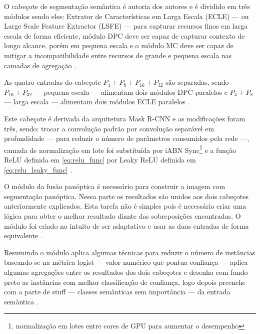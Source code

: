 
O cabeçote de segmentação semântica é autoria dos autores e é dividido em três módulos sendo eles: Extrator de Características em Larga Escala (ECLE) — ou Large Scale Feature Extractor (LSFE) — para capturar recursos finos em larga escala de forma eficiente, módulo DPC deve ser capaz de capturar contexto de longo alcance, porém em pequena escala e o módulo MC deve ser capaz de mitigar a incompatibilidade entre recursos de grande e pequena escala nas camadas de agregação \space\cite{mohan2020efficientps}.

As quatro entradas do cabeçote $ P_4 + P_8 + P_{16} + P_{32} $ são separadas, sendo $ P_{16} + P_{32} $ — pequena escala — alimentam dois módulos DPC paralelos e $ P_4 + P_8 $ — larga escala — alimentam dois módulos ECLE paralelos \space\cite{mohan2020efficientps}.


Este cabeçote é derivada da arquitetura Mask R-CNN e as modificações foram três, sendo: trocar a convolução padrão por convolução separável em profundidade — para reduzir o número de parâmetros consumidos pela rede —, camada de normalização em lote foi substituída por iABN Sync\footnote{normalização em lotes entre cores de GPU para aumentar o desempenho} e a função ReLU definida em \cref{eq:relu_func} por Leaky ReLU definida em \cref{eq:relu_leaky_func} \space\cite{mohan2020efficientps,redes-neurais-convolucionais-separaveis-em-profundidade, serp-ai}.


O módulo da fusão panóptica é necessário para construir a imagem com segmentação panóptica. Nessa parte os resultados são unidos aos dois cabeçotes anteriormente explicados. Esta tarefa não é simples pois é necessário criar uma lógica para obter o melhor resultado diante das sobreposições encontradas. O módulo foi criado no intuito de ser adaptativo e usar as duas entradas de forma equivalente \space\cite{mohan2020efficientps}.

Resumindo o módulo aplica algumas técnicas para reduzir o número de instâncias baseando-se na métrica logist — valor numérico que pontua confiança — aplica algumas agregações entre os resultados dos dois cabeçotes e desenha com fundo preto as instâncias com melhor classificação de confiança, logo depois preenche com a parte de stuff — classes semânticas sem importância — da entrada semântica \space\cite{mohan2020efficientps}.
